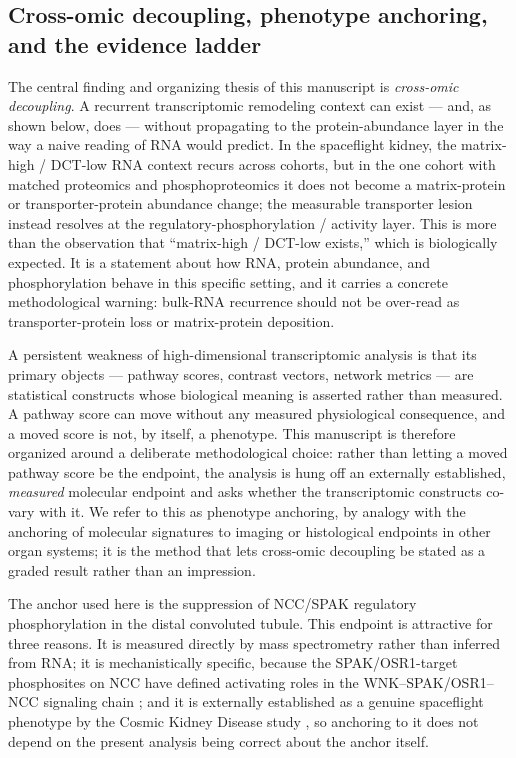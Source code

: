 \documentclass[11pt]{article}
\begin{document}
\subsection{Cross-omic decoupling, phenotype anchoring, and the evidence ladder}

The central finding and organizing thesis of this manuscript is \emph{cross-omic decoupling}. A recurrent transcriptomic remodeling context can exist --- and, as shown below, does --- without propagating to the protein-abundance layer in the way a naive reading of RNA would predict. In the spaceflight kidney, the matrix-high / DCT-low RNA context recurs across cohorts, but in the one cohort with matched proteomics and phosphoproteomics it does not become a matrix-protein or transporter-protein abundance change; the measurable transporter lesion instead resolves at the regulatory-phosphorylation / activity layer. This is more than the observation that ``matrix-high / DCT-low exists,'' which is biologically expected. It is a statement about how RNA, protein abundance, and phosphorylation behave in this specific setting, and it carries a concrete methodological warning: bulk-RNA recurrence should not be over-read as transporter-protein loss or matrix-protein deposition.

A persistent weakness of high-dimensional transcriptomic analysis is that its primary objects --- pathway scores, contrast vectors, network metrics --- are statistical constructs whose biological meaning is asserted rather than measured. A pathway score can move without any measured physiological consequence, and a moved score is not, by itself, a phenotype. This manuscript is therefore organized around a deliberate methodological choice: rather than letting a moved pathway score be the endpoint, the analysis is hung off an externally established, \emph{measured} molecular endpoint and asks whether the transcriptomic constructs co-vary with it. We refer to this as phenotype anchoring, by analogy with the anchoring of molecular signatures to imaging or histological endpoints in other organ systems; it is the method that lets cross-omic decoupling be stated as a graded result rather than an impression.

The anchor used here is the suppression of NCC/SPAK regulatory phosphorylation in the distal convoluted tubule. This endpoint is attractive for three reasons. It is measured directly by mass spectrometry rather than inferred from RNA; it is mechanistically specific, because the SPAK/OSR1-target phosphosites on NCC have defined activating roles in the WNK--SPAK/OSR1--NCC signaling chain \citep{ge2016wnk,castaneda2024dct}; and it is externally established as a genuine spaceflight phenotype by the Cosmic Kidney Disease study \citep{siew2024cosmic}, so anchoring to it does not depend on the present analysis being correct about the anchor itself.
\end{document}
